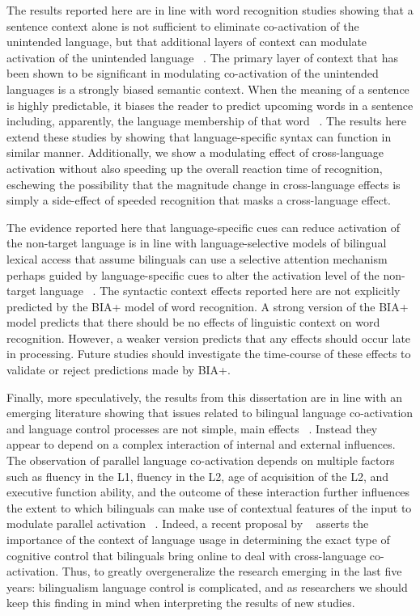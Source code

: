 The results reported here are in line with word recognition studies showing that a sentence context alone is not sufficient to eliminate co-activation of the unintended language, but that additional layers of context can modulate activation of the unintended language ~\citep[e.g.,][]{Schwartz2006,Libben2009}. The primary layer of context that has been shown to be significant in modulating co-activation of the unintended languages is a strongly biased semantic context. When the meaning of a sentence is highly predictable, it biases the reader to predict upcoming words in a sentence including, apparently, the language membership of that word ~\citep{Schwartz2006}. The results here extend these studies by showing that language-specific syntax can function in similar manner. Additionally, we show a modulating effect of cross-language activation without also speeding up the overall reaction time of recognition, eschewing the possibility that the magnitude change in cross-language effects is simply a side-effect of speeded recognition that masks a cross-language effect.

The evidence reported here that language-specific cues can reduce activation of the non-target language is in line with language-selective models of bilingual lexical access that assume bilinguals can use a selective attention mechanism perhaps guided by language-specific cues to alter the activation level of the non-target language ~\citep{Costa1999, Finkbeiner2006, LaHeij2005}. The syntactic context effects reported here are not explicitly predicted by the BIA+ model of word recognition. A strong version of the BIA+ model predicts that there should be no effects of linguistic context on word recognition. However, a weaker version predicts that any effects should occur late in processing. Future studies should investigate the time-course of these effects to validate or reject predictions made by BIA+.

Finally, more speculatively, the results from this dissertation are in line with an emerging literature showing that issues related to bilingual language co-activation and language control processes are not simple, main effects ~\citep[e.g.,][]{Bialystok2015,Green2013,Pivneva2014,Titone2011}. Instead they appear to depend on a complex interaction of internal and external influences. The observation of parallel language co-activation depends on multiple factors such as fluency in the L1, fluency in the L2, age of acquisition of the L2, and executive function ability, and the outcome of these interaction further influences the extent to which bilinguals can make use of contextual features of the input to modulate parallel activation ~\citep[e.g.,][; and the results reported here]{Pivneva2014,Titone2011}. Indeed, a recent proposal by ~\citep{Green2013} asserts the importance of the context of language usage in determining the exact type of cognitive control that bilinguals bring online to deal with cross-language co-activation. Thus, to greatly overgeneralize the research emerging in the last five years: bilingualism language control is complicated, and as researchers we should keep this finding in mind when interpreting the results of new studies. 

